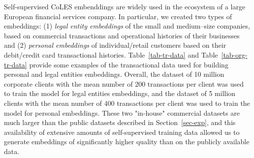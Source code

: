 \documentclass[sigconf, anonymous]{acmart}
\begin{document}
Self-supervised CoLES embenddings are widely used in the ecosystem of a large European financial services company.
In particular, we created two types of embeddings: (1) \emph{legal entity embeddings} of the small and medium--size companies,
based on commercial transactions and operational histories of their businesses and (2) \emph{personal embeddings} of individual/retail customers %
based on their debit/credit card transactional histories. Table~\ref{tab-tr-data} and Table~\ref{tab-org-tr-data} provide some examples of the transactional data used for building personal and legal entities embeddings. Overall, the dataset of 10 million corporate clients with the mean number of 200 transactions per client was used to train the model for legal entities embeddings, and the dataset of 5 million clients with the mean number of 400 transactions per client was used to train the model for personal embeddings. These two "in-house" commercial datasets are much larger than the public datasets described in Section~\ref{sec-exp}, and this availability of extensive amounts of self-supervised training data allowed us to generate embeddings of significantly higher quality than on the publicly available data.
\end{document}
